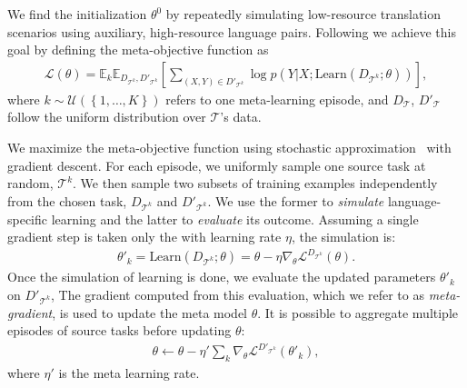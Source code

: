 We find the initialization $\theta^0$ by repeatedly simulating low-resource translation scenarios using auxiliary, high-resource language pairs. Following \citet{finn2017model} 
we achieve this goal by defining the meta-objective function as
\begin{align}
\label{cp6.eq.meta}
    \mathcal{L}(\theta) =
    \mathbb{E}_{k} \mathbb{E}_{D_{\mathcal{T}^{k}}, D'_{\mathcal{T}^{k}}} 
    \left[
    \sum_{(X,Y) \in D'_{\mathcal{T}^{k}}} \!\!\!\!\!\!\!
    \log p(Y|X; \text{Learn}(D_{\mathcal{T}^{k}}; \theta))
    \right],
\end{align}
where $k \!\sim\!\mathcal{U}(\left\{1, \ldots, K \right\})$ refers to one meta-learning episode, and $D_{\mathcal{T}}$,  $D'_{\mathcal{T}}$ follow the uniform distribution over $\mathcal{T}$'s data.  

We maximize the meta-objective function using stochastic approximation~\citep{robbins1951stochastic} with gradient descent. For each episode, we uniformly sample one source task at random, $\mathcal{T}^{k}$. %
We then sample two subsets of training examples independently from the chosen task, $D_{\mathcal{T}^{k}}$ and $D'_{\mathcal{T}^{k}}$. We use the former to {\it simulate} language-specific learning and the latter to {\it evaluate} its outcome. 
Assuming a single gradient step is taken only the with learning rate $\eta$,
the simulation is:
\begin{align}
    \theta'_k = \text{Learn}(D_{\mathcal{T}^k}; \theta) =
    \theta - \eta \nabla_{\theta} \mathcal{L}^{D_{\mathcal{T}^k}}(\theta).
\end{align}
Once the simulation of learning is done, we evaluate the updated parameters $\theta'_k$ on $D'_{\mathcal{T}^{k}}$, %
The gradient computed from this evaluation, which we refer to as {\it meta-gradient}, is used to update the meta model $\theta$. It is possible to aggregate multiple episodes of source tasks before updating $\theta$:
\begin{align}
    \theta \leftarrow \theta - \eta' \sum_k \nabla_\theta \mathcal{L}^{D'_{\mathcal{T}^{k}}}(\theta'_k),
\end{align}
where $\eta'$ is the meta learning rate. 

